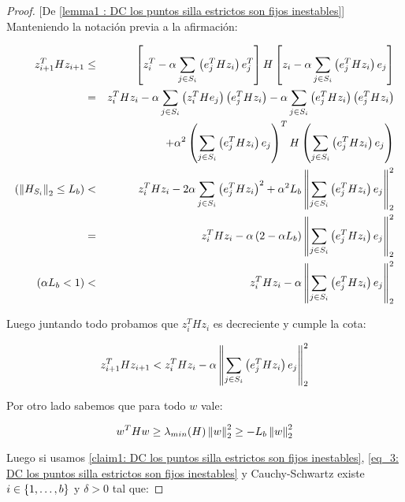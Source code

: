 \begin{proof}{[De \ref{lemma1 : DC los puntos silla estrictos son fijos inestables}]}
	Manteniendo la notaci\'on previa a la afirmaci\'on:
	
	\begin{equation*}
	\begin{aligned}
	z_{i+1}^THz_{i+1} & \leq & \left[z_i^T - \alpha \sum\limits_{j \in S_i}{\left( e_j^T H z_i \right) e_j^T} \right]H \left[ z_i - \alpha \sum\limits_{j \in S_i}{\left(e_j^T H z_i \right) e_j }\right] \\
	& = & z_i^T H z_i - \alpha \sum\limits_{j \in S_i}{\left(z_i^T H e_j\right)\left(e_j^T H z_i\right)} - \alpha \sum\limits_{j \in S_i}{\left(e_j^T H z_i\right)\left(e_j^T H z_i\right)} \\
	&& + \alpha^2 \left(\sum\limits_{j \in S_i}{\left(e_j^T H z_i\right)e_j}\right)^TH\left(\sum\limits_{j \in S_i}{\left(e_j^T H z_i\right)e_j}\right) \\
	\left(\left\lVert H_{S_i}\right\rVert_2 \leq L_b\right) & < & z_i^T H z_i -  2\alpha \sum\limits_{j \in S_i}{\left(e_j^T H z_i\right)^2 } + \alpha ^2 L_b \left\lVert\sum\limits_{j \in S_i}{\left(e_j^T H z_i\right)e_j}\right\rVert^2_2 \\
	& = & z_i^T H z_i -  \alpha \left(2 - \alpha L_b\right)\left\lVert\sum\limits_{j \in S_i}{\left(e_j^T H z_i\right)e_j}\right\rVert^2_2 \\
	\left(\alpha L_b < 1\right) & < & z_i^T H z_i -  \alpha \left\lVert\sum\limits_{j \in S_i}{\left(e_j^T H z_i\right)e_j}\right\rVert^2_2 
	\end{aligned} 
	\end{equation*}
	
	Luego juntando todo probamos que $z_i^T H z_i$ es decreciente y cumple la cota:
	
	\begin{equation}
	\label{eq_2: DC los puntos silla estrictos son fijos inestables}
	z_{i+1}^THz_{i+1}  < z_i^T H z_i -  \alpha \left\lVert\sum\limits_{j \in S_i}{\left(e_j^T H z_i\right)e_j}\right\rVert^2_2 
	\end{equation}
	
	Por otro lado sabemos que para todo $w$ vale:
	
	\begin{equation}
	\label{eq_3: DC los puntos silla estrictos son fijos inestables}
	w^THw  \geq  \lambda_{min}(H) \left\lVert w\right\rVert_2^2 \geq -L_b \left\lVert w\right\rVert^2_2
	\end{equation}
	
	Luego si usamos \ref{claim1: DC los puntos silla estrictos son fijos inestables}, \ref{eq_3: DC los puntos silla estrictos son fijos inestables} y Cauchy-Schwartz existe $i \in \left\lbrace1, \dots, b\right\rbrace$ y $\delta >0$ tal que:
	

\end{proof}
